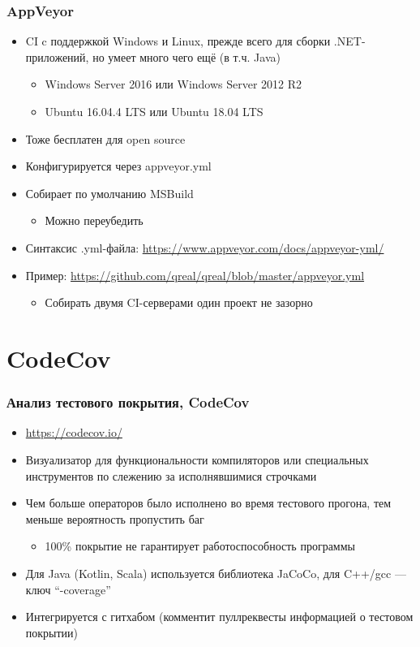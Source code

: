 \documentclass[xetex,mathserif,serif]{beamer}
\begin{document}
	\begin{frame}
		\frametitle{AppVeyor}
		\begin{itemize}
			\item CI c поддержкой Windows и Linux, прежде всего для сборки .NET-приложений, но умеет много чего ещё (в т.ч. Java)
			\begin{itemize}
				\item Windows Server 2016 или Windows Server 2012 R2
				\item Ubuntu 16.04.4 LTS или Ubuntu 18.04 LTS
			\end{itemize}
			\item Тоже бесплатен для open source
			\item Конфигурируется через appveyor.yml
			\item Собирает по умолчанию MSBuild
			\begin{itemize}
				\item Можно переубедить
			\end{itemize}
			\item Синтаксис .yml-файла: \url{https://www.appveyor.com/docs/appveyor-yml/}
			\item Пример: \url{https://github.com/qreal/qreal/blob/master/appveyor.yml}
			\begin{itemize}
				\item Собирать двумя CI-серверами один проект не зазорно
			\end{itemize}
		\end{itemize}
	\end{frame}

	\section{CodeCov}

	\begin{frame}
		\frametitle{Анализ тестового покрытия, CodeCov}
		\begin{itemize}
			\item \url{https://codecov.io/}
			\item Визуализатор для функциональности компиляторов или специальных инструментов по слежению за исполнявшимися строчками
			\item Чем больше операторов было исполнено во время тестового прогона, тем меньше вероятность пропустить баг
			\begin{itemize}
				\item 100\% покрытие не гарантирует работоспособность программы
			\end{itemize}
			\item Для Java (Kotlin, Scala) используется библиотека JaCoCo, для C++/gcc --- ключ ``-coverage''
			\item Интегрируется с гитхабом (комментит пуллреквесты информацией о тестовом покрытии)
		\end{itemize}
	\end{frame}
\end{document}
